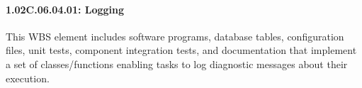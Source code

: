 \paragraph{1.02C.06.04.01: Logging}

This WBS element includes software programs, database tables, configuration files, unit tests, component integration tests, and documentation that implement a set of classes/functions enabling tasks to log diagnostic messages about their execution.
